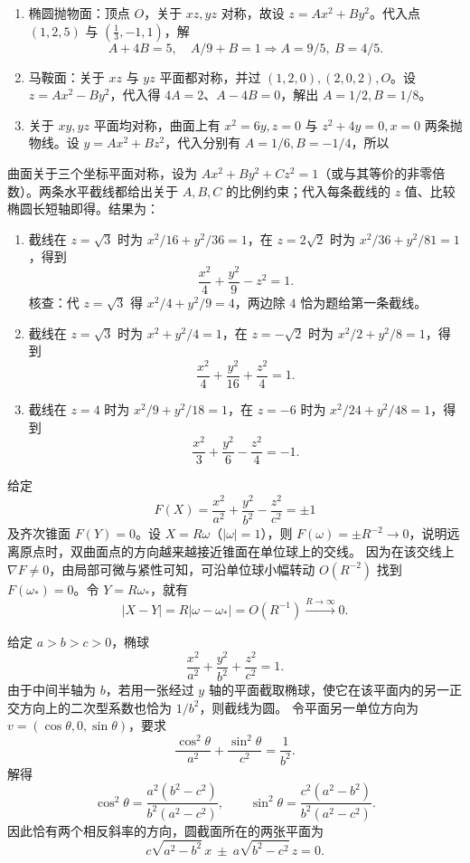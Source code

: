 \begin{enumerate}[label=(\arabic*)]
\item 椭圆抛物面：顶点 $O$，关于 $xz,yz$ 对称，故设 $z=Ax^2+By^2$。代入点 $(1,2,5)$ 与 $(\tfrac13,-1,1)$，解
\[A+4B=5,\quad A/9+B=1\Longrightarrow A=9/5,\ B=4/5.\]
\item 马鞍面：关于 $xz$ 与 $yz$ 平面都对称，并过 $(1,2,0),(2,0,2),O$。设 $z=Ax^2-By^2$，代入得 $4A=2$、$A-4B=0$，解出 $A=1/2,B=1/8$。
\item 关于 $xy,yz$ 平面均对称，曲面上有 $x^2=6y,z=0$ 与 $z^2+4y=0,x=0$ 两条抛物线。设 $y=Ax^2+Bz^2$，代入分别有 $A=1/6,B=-1/4$，所以
\end{enumerate}

曲面关于三个坐标平面对称，设为 $Ax^2+By^2+Cz^2=1$（或与其等价的非零倍数）。两条水平截线都给出关于 $A,B,C$ 的比例约束；代入每条截线的 $z$ 值、比较椭圆长短轴即得。结果为：
\begin{enumerate}[label=(\arabic*)]
\item 截线在 $z=\sqrt3$ 时为 $x^2/16+y^2/36=1$，在 $z=2\sqrt2$ 时为 $x^2/36+y^2/81=1$，得到
\[\boxed{\frac{x^2}{4}+\frac{y^2}{9}-z^2=1}.\]
核查：代 $z=\sqrt3$ 得 $x^2/4+y^2/9=4$，两边除 $4$ 恰为题给第一条截线。
\item 截线在 $z=\sqrt3$ 时为 $x^2+y^2/4=1$，在 $z=-\sqrt2$ 时为 $x^2/2+y^2/8=1$，得到
\[\boxed{\frac{x^2}{4}+\frac{y^2}{16}+\frac{z^2}{4}=1}.\]
\item 截线在 $z=4$ 时为 $x^2/9+y^2/18=1$，在 $z=-6$ 时为 $x^2/24+y^2/48=1$，得到
\[\boxed{\frac{x^2}{3}+\frac{y^2}{6}-\frac{z^2}{4}=-1}.\]
\end{enumerate}

给定
\[F(X)=\frac{x^2}{a^2}+\frac{y^2}{b^2}-\frac{z^2}{c^2}=\pm1\]
及齐次锥面 $F(Y)=0$。设 $X=R\omega$（$|\omega|=1$），则 $F(\omega)=\pm R^{-2}\to0$，说明远离原点时，双曲面点的方向越来越接近锥面在单位球上的交线。
因为在该交线上 $\nabla F\ne0$，由局部可微与紧性可知，可沿单位球小幅转动 $O(R^{-2})$ 找到 $F(\omega_*)=0$。令 $Y=R\omega_*$，就有
\[|X-Y|=R|\omega-\omega_*|=O(R^{-1})\xrightarrow{R\to\infty}0.\]

给定 $a>b>c>0$，椭球
\[\frac{x^2}{a^2}+\frac{y^2}{b^2}+\frac{z^2}{c^2}=1.\]
由于中间半轴为 $b$，若用一张经过 $y$ 轴的平面截取椭球，使它在该平面内的另一正交方向上的二次型系数也恰为 $1/b^2$，则截线为圆。
令平面另一单位方向为 $v=(\cos\theta,0,\sin\theta)$，要求
\[\frac{\cos^2\theta}{a^2}+\frac{\sin^2\theta}{c^2}=\frac1{b^2}.\]
解得
\[\cos^2\theta=\frac{a^2(b^2-c^2)}{b^2(a^2-c^2)},\qquad
\sin^2\theta=\frac{c^2(a^2-b^2)}{b^2(a^2-c^2)}.\]
因此恰有两个相反斜率的方向，圆截面所在的两张平面为
\[\boxed{c\sqrt{a^2-b^2}\,x\ \pm\ a\sqrt{b^2-c^2}\,z=0}.\]

